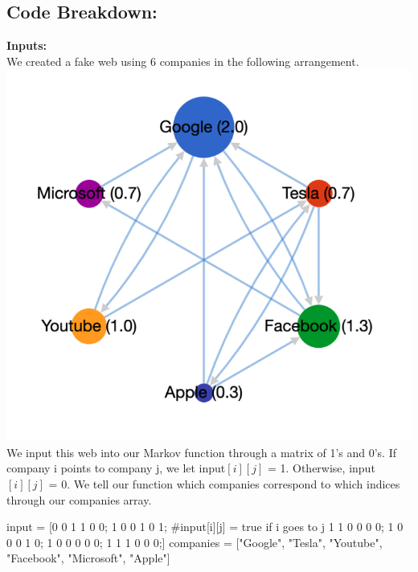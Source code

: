 \documentclass{article}
\begin{document}
\subsection{Code Breakdown:}
\textbf{Inputs:}\\
We created a fake web using 6 companies in the following arrangement.\\
\includegraphics[scale = 0.5]{companies.png}\\
We input this web into our Markov function through a matrix of 1's and 0's. If company i points to company j, we let input$[i][j]$ = 1. Otherwise, input$[i][j]$ = 0. We tell our function which companies correspond to which indices through our companies array.\\
\begin{codeblock}
input = [0 0 1 1 0 0;
         1 0 0 1 0 1; #input[i][j] = true if i goes to j
         1 1 0 0 0 0;
         1 0 0 0 1 0;
         1 0 0 0 0 0;
         1 1 1 0 0 0;]
companies = ["Google", "Tesla", "Youtube", "Facebook", "Microsoft", "Apple"]
\end{codeblock}
\end{document}
